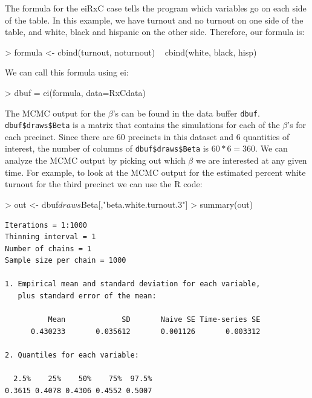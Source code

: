 \documentclass[11pt,oneside,letterpaper,titlepage]{article}
\begin{document}
The formula for the eiRxC case tells the program which variables go on each side of the table.  In this example, we have turnout and no turnout on one side of the table, and white, black and hispanic on the other side.  Therefore, our formula is:

\begin{Schunk}
\begin{Sinput}
> formula <- cbind(turnout, noturnout) ~ cbind(white, black, hisp)
\end{Sinput}
\end{Schunk}

We can call this formula using ei:
\begin{Schunk}
\begin{Sinput}
> dbuf = ei(formula, data=RxCdata)
\end{Sinput}
\end{Schunk}

The MCMC output for the $\beta$'s can be found in the data buffer \verb#dbuf#.  \verb#dbuf$draws$Beta# is a matrix that contains the simulations for each of the $\beta$'s for each precinct.  Since there are 60 precincts in this dataset and 6 quantities of interest, the number of columns of \verb#dbuf$draws$Beta# is $60*6 = 360$.  We can analyze the MCMC output by picking out which $\beta$ we are interested at any given time.  For example, to look at the MCMC output for the estimated percent white turnout for the third precinct we can use the R code:

\begin{Schunk}
\begin{Sinput}
> out <- dbuf$draws$Beta[,"beta.white.turnout.3"]
> summary(out)
\end{Sinput}
\end{Schunk}

\begin{verbatim}
Iterations = 1:1000
Thinning interval = 1 
Number of chains = 1 
Sample size per chain = 1000 

1. Empirical mean and standard deviation for each variable,
   plus standard error of the mean:

          Mean             SD       Naive SE Time-series SE 
      0.430233       0.035612       0.001126       0.003312 

2. Quantiles for each variable:

  2.5%    25%    50%    75%  97.5% 
0.3615 0.4078 0.4306 0.4552 0.5007 

\end{verbatim}
\end{document}
